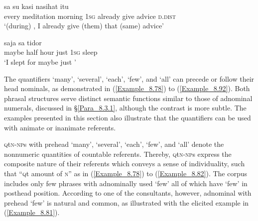 \ea
\label{Example_8.76}
 {} {} {sa} {su} {kasi} {nasihat} {itu}\\ %
 every  meditation  morning  \textsc{1sg}  already  give  advice  \textsc{d.dist}\\
\glt 
‘(during) , I already give (them) that (same) advice’ \textstyleExampleSource{[081115-001b-Cv.0008]}
\z

\ea
\label{Example_8.77}
 {} {} {saja} {sa} {tidor}\\ %
 maybe  half  hour  just  \textsc{1sg}  sleep\\
\glt 
‘I slept for maybe just ’ \textstyleExampleSource{[081115-001b-Cv.0056]}
\z



The quantifiers  ‘many’,  ‘several’,  ‘each’,  ‘few’, and  ‘all’ can precede or follow their head nominals, as demonstrated in (\ref{Example_8.78}) to (\ref{Example_8.92}). Both phrasal structures serve distinct semantic functions similar to those of adnominal numerals, discussed in §\ref{Para_8.3.1}, although the contrast is more subtle. The examples presented in this section also illustrate that the quantifiers can be used with animate or inanimate referents.



\textsc{q}t\textsc{n-np}s with prehead  ‘many’,  ‘several’,  ‘each’,  ‘few’, and  ‘all’ denote the nonnumeric quantities of countable referents. Thereby, \textsc{q}t\textsc{n-np}s express the composite nature of their referents which conveys a sense of individuality, such that ``\textsc{q}t amount of \textsc{n}'' as in (\ref{Example_8.78}) to (\ref{Example_8.82}). The corpus includes only few  phrases with adnominally used  ‘few’ all of which have  ‘few’ in posthead position. According to one of the consultants, however, adnominal  with prehead  ‘few’ is natural and common, as illustrated with the elicited example in (\ref{Example_8.81}).



